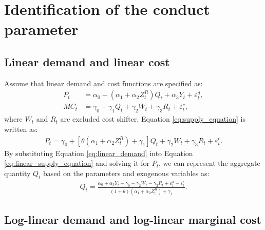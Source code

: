 \documentclass[11pt, a4paper]{article}
\begin{document}

\section{Identification of the conduct parameter}

\subsection{Linear demand and linear cost}
Assume that linear demand and cost functions are specified as:
\begin{align}
    P_t &= \alpha_0 - (\alpha_1 + \alpha_2Z^{R}_{t})Q_t + \alpha_3 Y_t + \varepsilon^{d}_{t},\label{eq:linear_demand}\\
    MC_t &= \gamma_0  + \gamma_1 Q_{t} + \gamma_2 W_{t} + \gamma_3 R_t + \varepsilon^{c}_{t},\label{eq:linear_marginal_cost}
\end{align}
where $W_{t}$ and $R_t$ are excluded cost shifter. Equation \eqref{eq:supply_equation} is written as:
\begin{align}
    P_t = \gamma_0 + [\theta(\alpha_1 + \alpha_2Z^{R}_{t})+ \gamma_1] Q_t   + \gamma_2 W_{t} + \gamma_3 R_t + \varepsilon^{c}_{t}.\label{eq:linear_supply_equation}
\end{align}
By substituting Equation \eqref{eq:linear_demand} into Equation \eqref{eq:linear_supply_equation} and solving it for $P_t$, we can represent the aggregate quantity $Q_t$ based on the parameters and exogenous variables as:
\begin{align*}
    Q_t =  \frac{\alpha_0 + \alpha_3 Y_t - \gamma_0 - \gamma_2 W_{t} - \gamma_3 R_t + \varepsilon^{d}_{t} - \varepsilon^{c}_{t}}{(1 + \theta) (\alpha_1 + \alpha_2 Z^{R}_{t}) + \gamma_1}.
\end{align*}


\subsection{Log-linear demand and log-linear marginal cost}
\end{document}

